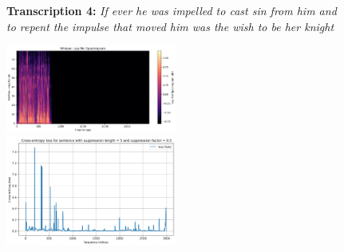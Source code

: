 \documentclass[../report.tex]{subfiles}
\begin{document}
    \begin{figure}[p]
        \centering
        \begin{minipage}{0.95\textwidth}
        \raggedright
        \textbf{Transcription 4:} \textit{If ever he was impelled to cast sin from him and to repent the impulse that moved him was the wish to be her knight}
        \end{minipage}
        
        \includegraphics[width=0.5\textwidth]{figures/mel4.png}
        \includegraphics[width=0.5\textwidth]{figures/loss_diff_sentence_4_sentence.png}

\end{figure}
\end{document}
